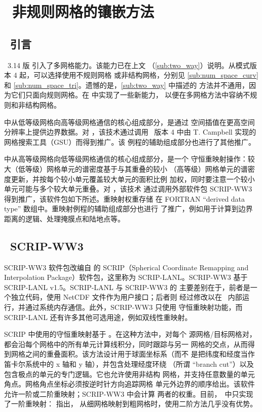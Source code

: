 \pagestyle{myheadings} \setcounter{page}{1} \setcounter{footnote}{0}

\section{~非规则网格的镶嵌方法} \label{app:scrip}
\newcounters

\vssub
\subsection{~引言} \label{sec:scripA}
\vssub

\noindent
\ws\ 3.14 版 \citep{tol:MMAB09a} 引入了多网格能力。该能力已在上文
（\para\ref{sub:two_way}）说明。从模式版本 4 起，可以选择使用不规则网格
或非结构网格，分别见 \para\ref{sub:num_space_curv} 和
\para\ref{sub:num_space_tri}。遗憾的是，\para\ref{sub:two_way} 中描述的
方法并不通用，因为它们只面向规则网格。在 \WWver{} 中实现了一些新能力，
以便在多网格方法中容纳不规则和非结构网格。

\cite{tol:OMOD08b} 中从低等级网格向高等级网格通信的核心组成部分，是通过
空间插值在更高空间分辨率上提供边界数据。对 \WWver{}，该技术通过调用
\ws\ 版本 4 中由 T. Campbell 实现的网格搜索工具（GSU）而得到推广。该
例程的辅助组成部分也进行了其他推广。

\cite{tol:OMOD08b} 中从高等级网格向低等级网格通信的核心组成部分，是一个
守恒重映射操作：较大（低等级）网格单元的谱密度基于与其重叠的较小
（高等级）网格单元的谱密度更新，并按每个较小单元覆盖较大单元的面积比例
加权，同时要注意一个较小单元可能与多个较大单元重叠。对 \WWver{}，该技术
通过调用外部软件包 SCRIP-WW3 得到推广，该软件包如下所述。重映射权重存储
在 FORTRAN ``derived data type'' 数组中。重映射例程的辅助组成部分也进行
了推广，例如用于计算到边界距离的逻辑、处理掩膜点和陆地点等。

\vssub
\subsection{~SCRIP-WW3} \label{sec:scripB}
\vssub

SCRIP-WW3 软件包改编自 \cite{man:Jones98} 的 {\F SCRIP}（Spherical
Coordinate Remapping and Interpolation Package）软件包，这里称为
SCRIP-LANL。SCRIP-WW3 基于 SCRIP-LANL v1.5。SCRIP-LANL 与 SCRIP-WW3 的
主要差别在于，前者是一个独立代码，使用 NetCDF 文件作为用户接口；后者则
经过修改以在 \ws\ 内部运行，并通过系统内存通信。此外，SCRIP-WW3 只使用
守恒重映射功能，而 SCRIP-LANL 还有许多其他可选用途，例如双线性重映射。

SCRIP 中使用的守恒重映射基于 \cite{art:Jones99}。在这种方法中，对每个
源网格/目标网格对，都会沿每个网格中的所有单元计算线积分，同时跟踪与另一
网格的交点，从而得到网格之间的重叠面积。该方法设计用于球面坐标系（而不
是把纬度和经度当作笛卡尔系统中的 x 轴和 y 轴），并包含处理经度环绕
（所谓 ``branch cut''）以及包含极点的单元的专门逻辑。它也允许使用非结构
网格，并支持任意数量的单元角点。网格角点坐标必须按逆时针方向追踪网格
单元外边界的顺序给出。该软件允许一阶或二阶重映射；SCRIP-WW3 中会计算
两者的权重。目前，\ws\ 中只实现了一阶重映射：\cite{art:Jones99} 指出，
从细网格映射到粗网格时，使用二阶方法几乎没有优势。

